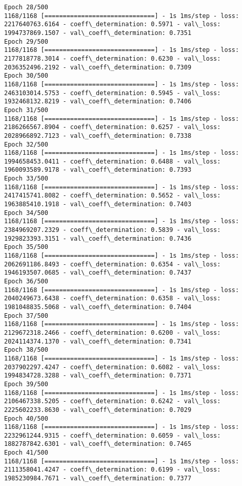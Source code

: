 \documentclass[11pt]{article}
\begin{document}
\begin{Verbatim}[commandchars=\\\{\}]
Epoch 28/500
1168/1168 [==============================] - 1s 1ms/step - loss: 2217640763.6164 - coeff\_determination: 0.5971 - val\_loss: 1994737869.1507 - val\_coeff\_determination: 0.7351
Epoch 29/500
1168/1168 [==============================] - 1s 1ms/step - loss: 2177818778.3014 - coeff\_determination: 0.6230 - val\_loss: 2036352496.2192 - val\_coeff\_determination: 0.7309
Epoch 30/500
1168/1168 [==============================] - 1s 1ms/step - loss: 2463103014.5753 - coeff\_determination: 0.5945 - val\_loss: 1932468132.8219 - val\_coeff\_determination: 0.7406
Epoch 31/500
1168/1168 [==============================] - 1s 1ms/step - loss: 2186266567.8904 - coeff\_determination: 0.6257 - val\_loss: 2028966892.7123 - val\_coeff\_determination: 0.7338
Epoch 32/500
1168/1168 [==============================] - 1s 1ms/step - loss: 1994658453.0411 - coeff\_determination: 0.6488 - val\_loss: 1960093589.9178 - val\_coeff\_determination: 0.7393
Epoch 33/500
1168/1168 [==============================] - 1s 1ms/step - loss: 2417415741.8082 - coeff\_determination: 0.5652 - val\_loss: 1963885410.1918 - val\_coeff\_determination: 0.7403
Epoch 34/500
1168/1168 [==============================] - 1s 1ms/step - loss: 2384969207.2329 - coeff\_determination: 0.5839 - val\_loss: 1929823393.3151 - val\_coeff\_determination: 0.7436
Epoch 35/500
1168/1168 [==============================] - 1s 1ms/step - loss: 2062691186.8493 - coeff\_determination: 0.6354 - val\_loss: 1946193507.0685 - val\_coeff\_determination: 0.7437
Epoch 36/500
1168/1168 [==============================] - 1s 1ms/step - loss: 2040249673.6438 - coeff\_determination: 0.6358 - val\_loss: 1981048835.5068 - val\_coeff\_determination: 0.7404
Epoch 37/500
1168/1168 [==============================] - 1s 1ms/step - loss: 2129672318.2466 - coeff\_determination: 0.6200 - val\_loss: 2024114374.1370 - val\_coeff\_determination: 0.7341
Epoch 38/500
1168/1168 [==============================] - 1s 1ms/step - loss: 2037902297.4247 - coeff\_determination: 0.6082 - val\_loss: 1994834728.3288 - val\_coeff\_determination: 0.7371
Epoch 39/500
1168/1168 [==============================] - 1s 1ms/step - loss: 2106467338.5205 - coeff\_determination: 0.6242 - val\_loss: 2225602233.8630 - val\_coeff\_determination: 0.7029
Epoch 40/500
1168/1168 [==============================] - 1s 1ms/step - loss: 2232961244.9315 - coeff\_determination: 0.6059 - val\_loss: 1882787842.6301 - val\_coeff\_determination: 0.7465
Epoch 41/500
1168/1168 [==============================] - 1s 1ms/step - loss: 2111358041.4247 - coeff\_determination: 0.6199 - val\_loss: 1985230984.7671 - val\_coeff\_determination: 0.7377

\end{Verbatim}
\end{document}
